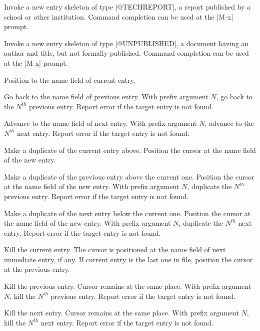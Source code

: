 Invoke a new entry skeleton of type |@TECHREPORT|,
a report published by a school or other institution.
Command completion can be used at the |M-x| prompt.

Invoke a new entry skeleton of type |@UNPUBLISHED|,
a document having an author and title, but not formally published.
Command completion can be used at the |M-x| prompt.

Position to the name field of current entry.

Go back to the name field of previous entry.
With prefix argument $N$, go back to the $N^{th}$ previous entry.
Report error if the target entry is not found.

Advance to the name field of next entry.
With prefix argument $N$, advance to the $N^{th}$ next entry.
Report error if the target entry is not found.

Make a duplicate of the current entry above.  Position the cursor at
the name field of the new entry.

Make a duplicate of the previous entry above the current one.
Position the cursor at the name field of the new entry.
With prefix argument $N$, duplicate the $N^{th}$ previous entry.
Report error if the target entry is not found.

Make a duplicate of the next entry below the current one.
Position the cursor at the name field of the new entry.
With prefix argument $N$, duplicate the $N^{th}$ next entry.
Report error if the target entry is not found.

Kill the current entry.  The cursor is positioned at the
name field of next immediate entry, if any.  If current entry
is the last one in file, position the cursor at the previous entry.

Kill the previous entry.  Cursor remains at the same place.
With prefix argument $N$, kill the $N^{th}$ previous entry.
Report error if the target entry is not found.

Kill the next entry.  Cursor remains at the same place.
With prefix argument $N$, kill the $N^{th}$ next entry.
Report error if the target entry is not found.

